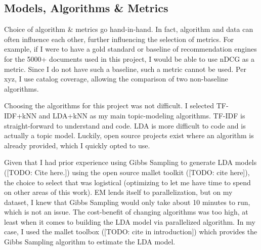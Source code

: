 \subsection{Models, Algorithms \& Metrics}
Choice of algorithm \& metrics go hand-in-hand. In fact, algorithm and data can often influence each other, further influencing the selection of metrics. For example, if I were to have a gold standard or baseline of recommendation engines for the 5000+ documents used in this project, I would be able to use nDCG as a metric. Since I do not have such a baseline, such a metric cannot be used. Per xyz, I use catalog coverage, allowing the comparison of two non-baseline algorithms.

Choosing the algorithms for this project was not difficult. I selected TF-IDF+kNN and LDA+kNN as my main topic-modeling algorithms. TF-IDF is straight-forward to understand and code. LDA is more difficult to code and is actually a topic model. Luckily, open source projects exist where an algorithm is already provided, which I quickly opted to use.

Given that I had prior experience using Gibbs Sampling to generate LDA models ([TODO: Cite here.]) using the open source mallet toolkit ([TODO: cite here]), the choice to select that was logistical (optimizing to let me have time to spend on other areas of this work). EM lends itself to parallelization, but on my dataset, I knew that Gibbs Sampling would only take about 10 minutes to run, which is not an issue. The cost-benefit of changing algorithms was too high, at least when it comes to building the LDA model via parallelized algorithm. In my case, I used the mallet toolbox ([TODO: cite in introduction]) which provides the Gibbs Sampling algorithm to estimate the LDA model.


